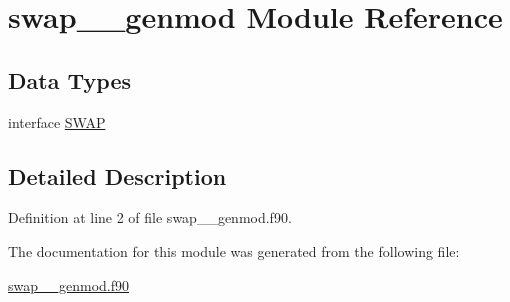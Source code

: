 \hypertarget{classswap____genmod}{\section{swap\+\_\+\+\_\+genmod Module Reference}
\label{classswap____genmod}
}
\subsection*{Data Types}
\begin{DoxyCompactItemize}
\item 
interface \hyperlink{interfaceswap____genmod_1_1SWAP}{S\+W\+A\+P}
\end{DoxyCompactItemize}


\subsection{Detailed Description}


Definition at line 2 of file swap\+\_\+\+\_\+genmod.\+f90.



The documentation for this module was generated from the following file\+:\begin{DoxyCompactItemize}
\item 
\hyperlink{swap____genmod_8f90}{swap\+\_\+\+\_\+genmod.\+f90}\end{DoxyCompactItemize}
